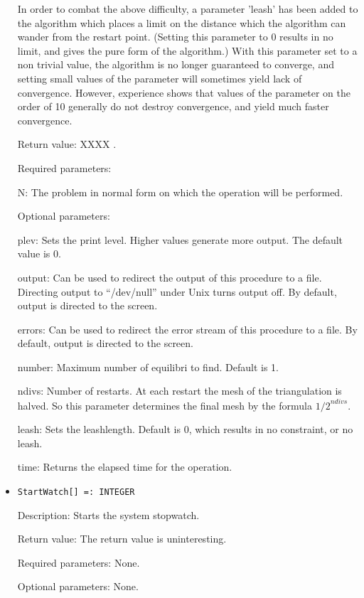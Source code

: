 \begin{itemize}
In order to combat the above difficulty, a parameter 'leash' has been
added to the algorithm which places a limit on the distance which the
algorithm can wander from the restart point. (Setting this parameter
to 0 results in no limit, and gives the pure form of the algorithm.)
With this parameter set to a non trivial value, the algorithm is no
longer guaranteed to converge, and setting small values of the
parameter will sometimes yield lack of convergence.  However,
experience shows that values of the parameter on the order of 10
generally do not destroy convergence, and yield much faster
convergence.

\item
[Return value:] XXXX .
\item
[Required parameters:]\hfil\null

\bd
\item
[N:] The problem in normal form on which the operation will be
performed.
\ed

\item
[Optional parameters:]\hfil\null
	
\bd
\item
[plev:] Sets the print level.  Higher values generate more output.
The default value is 0.
\item
[output:] Can be used to redirect the output of this procedure to a
file.  Directing output to ``/dev/null'' under Unix turns output off.
By default, output is directed to the screen.
\item
[errors:] Can be used to redirect the error stream of this procedure
to a file.  By default, output is directed to the screen.
\item
[number:] Maximum number of equilibri to find. Default is 1.  
\item 
[ndivs:] Number of restarts.  At each restart the mesh of the
triangulation is halved.  So this parameter determines the final mesh
by the formula ${1/2}^{ndivs}$.
\item
[leash:] Sets the leashlength. Default is 0, which results in no
constraint, or no leash.  
\item
[time:] Returns the elapsed time for the operation.
\ed
\ed

\item

\protect \large \begin{verbatim}
StartWatch[] =: INTEGER
\end{verbatim}\normalsize

\bd
\item
[Description:] Starts the system stopwatch.
\item
[Return value:] The return value is uninteresting.
\item
[Required parameters:] None.
\item
[Optional parameters:] None.
\ed


\end{itemize}
